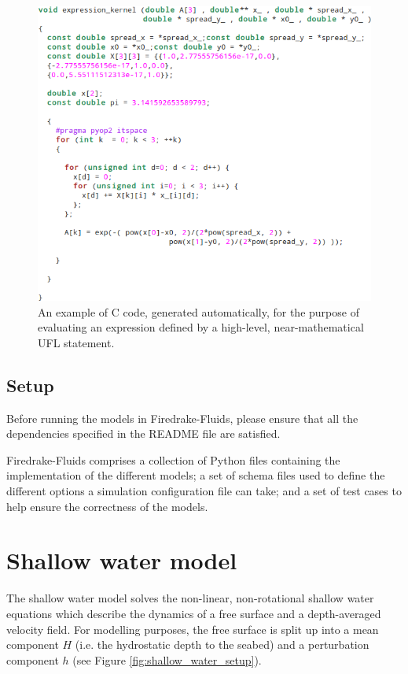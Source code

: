 \documentclass[a4paper,11pt]{report}
\begin{document}
\begin{figure}
   \centering
   \includegraphics[width=0.75\columnwidth]{images/c_kernel.png}
   \caption{An example of C code, generated automatically, for the purpose of evaluating an expression defined by a high-level, near-mathematical UFL statement.}
   \label{fig:c_kernel}
\end{figure}

\section{Setup}
Before running the models in Firedrake-Fluids, please ensure that all the dependencies specified in the README file are satisfied.

Firedrake-Fluids comprises a collection of Python files containing the implementation of the different models; a set of schema files used to define the different options a simulation configuration file can take; and a set of test cases to help ensure the correctness of the models.

\chapter{Shallow water model}
The shallow water model solves the non-linear, non-rotational shallow water equations which describe the dynamics of a free surface and a depth-averaged velocity field. For modelling purposes, the free surface is split up into a mean component $H$ (i.e. the hydrostatic depth to the seabed) and a perturbation component $h$ (see Figure \ref{fig:shallow_water_setup}).
\end{document}

